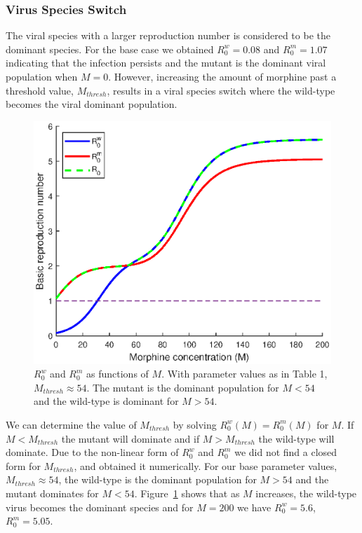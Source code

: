 \documentclass[11pt, oneside]{article}    %
\begin{document}
\subsubsection{Virus Species Switch}
\label{section:Virus Species Switch}

The viral species with a larger reproduction number is considered to be the dominant species. For the base case we obtained $R_0^w = 0.08$ and $R_0^m = 1.07$ indicating that the infection persists and the mutant is the dominant viral population when $M=0$. However, increasing the amount of morphine past a threshold value, $M_{thresh}$, results in a viral species switch where the wild-type becomes the viral dominant population. 

\begin{figure}[H]
\begin{center}
\includegraphics[scale=0.75]{pop_switch.eps}
\caption{$R_0^w$ and $R_0^m$ as functions of $M$. With parameter values as in Table 1, $M_{thresh} \approx 54$. The mutant is the dominant population for $M<54$ and the wild-type is dominant for $M>54$.}
\label{fig:pop_switch}
\end{center}
\end{figure}

We can determine the value of $M_{thresh}$ by solving $R_0^w(M) = R_0^m(M)$ for $M$. If $M<M_{thresh}$ the mutant will dominate and if $M>M_{thresh}$ the wild-type will dominate. Due to the non-linear form of $R_0^w$ and $R_0^m$ we did not find a closed form for $M_{thresh}$, and obtained it numerically. For our base parameter values, $M_{thresh} \approx 54$, the wild-type is the dominant population for $M>54$ and the mutant dominates for $M<54$. Figure~\ref{fig:pop_switch} shows that as $M$ increases, the wild-type virus becomes the dominant species and for $M=200$ we have $R_0^w = 5.6$, $R_0^m = 5.05$.
\end{document}
